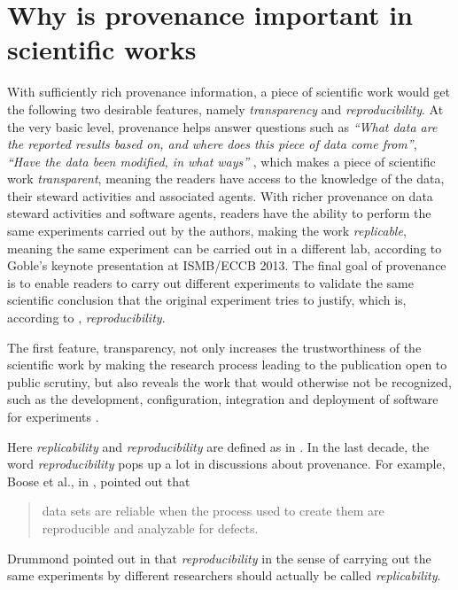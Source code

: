 \section{Why is provenance important in scientific works}
With sufficiently rich provenance information, a piece of scientific work would get the following two 
desirable features, namely \emph{transparency} and \emph{reproducibility}. At the very basic level, 
provenance helps answer questions such as \emph{``What data are the reported results based on, and 
where does this piece of data come from''}, \emph{``Have the data been modified, in what ways''} 
\cite{davidson2008provenance}, which makes a piece of scientific work \emph{transparent}, meaning the 
readers have access to the knowledge of the data, their steward activities and associated agents. 
With richer provenance on data steward activities and software agents, readers have the ability to 
perform the same experiments carried out by the authors, making the work \emph{replicable}, meaning 
the same experiment can be carried out in a different lab, according to Goble's keynote presentation 
at ISMB/ECCB 2013. The final goal of provenance is to enable readers to carry out different 
experiments to validate the same scientific conclusion that the original experiment tries to justify, 
which is, according to \cite{drummond2009replicability}, \emph{reproducibility}.

The first feature, transparency, not only increases the trustworthiness of the scientific work by 
making the research process leading to the publication open to public scrutiny, but also reveals the 
work that would otherwise not be recognized, such as the development, configuration, integration and 
deployment of software for experiments \cite{goble2014better}.

Here \emph{replicability} and \emph{reproducibility} are defined as in 
\cite{drummond2009replicability}. In the last decade, the word \emph{reproducibility} pops up a lot 
in discussions about provenance. For example, 
Boose et al., in \cite{boose2007ensuring}, pointed out that
\begin{quote}data sets are reliable when the process used to create them are reproducible and 
analyzable for defects.\end{quote}
Drummond pointed out in \cite{drummond2009replicability} that \emph{reproducibility} in the sense of 
carrying out the same experiments by different researchers should actually be called 
\emph{replicability}.

